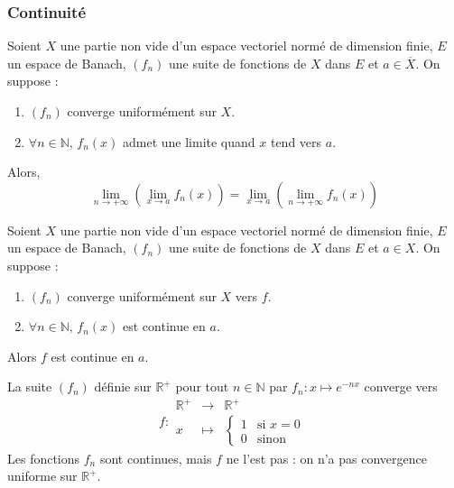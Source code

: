   \subsubsection{Continuité}


  \begin{theorem}
    Soient $X$ une partie non vide d'un espace vectoriel normé de dimension finie, $E$ un espace de Banach, $(f_n)$ une suite de fonctions de $X$ dans $E$ et $a \in \overline{X}$. On suppose :
    \begin{enumerate}[label={\bfseries(\roman*)}]
      \item $(f_n)$ converge uniformément sur $X$.
      \item $\forall n \in \mathbb{N}, \, f_n(x)$ admet une limite quand $x$ tend vers $a$.
    \end{enumerate}
    Alors,
    \[ \lim_{n \rightarrow +\infty} \left( \lim_{x \rightarrow a} f_n(x) \right) = \lim_{x \rightarrow a} \left( \lim_{n \rightarrow +\infty} f_n(x) \right) \]
  \end{theorem}

  \begin{theorem}
    Soient $X$ une partie non vide d'un espace vectoriel normé de dimension finie, $E$ un espace de Banach, $(f_n)$ une suite de fonctions de $X$ dans $E$ et $a \in X$. On suppose :
    \begin{enumerate}[label={\bfseries(\roman*)}]
      \item $(f_n)$ converge uniformément sur $X$ vers $f$.
      \item $\forall n \in \mathbb{N}, \, f_n(x)$ est continue en $a$.
    \end{enumerate}
    Alors $f$ est continue en $a$.
  \end{theorem}

  \begin{example}
    La suite $(f_n)$ définie sur $\mathbb{R}^+$ pour tout $n \in \mathbb{N}$ par $f_n : x \mapsto e^{-nx}$ converge vers
    \[
    f :
    \begin{array}{ccc}
      \mathbb{R}^+ &\rightarrow& \mathbb{R}^+ \\
      x &\mapsto& \begin{cases}
        1 &\text{si } x = 0 \\
        0 &\text{sinon}
      \end{cases}
    \end{array}
    \]
    Les fonctions $f_n$ sont continues, mais $f$ ne l'est pas : on n'a pas convergence uniforme sur $\mathbb{R}^+$.
  \end{example}

